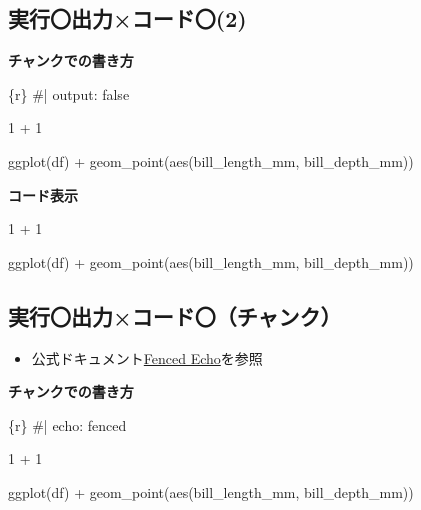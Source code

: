\documentclass[
  b5paper,
  xelatex, ja=standard]{bxjsbook}
\newenvironment{Shaded}{\begin{snugshade}}{\end{snugshade}}
\newcommand{\DecValTok}[1]{\textcolor[rgb]{0.68,0.00,0.00}{#1}}
\newcommand{\FunctionTok}[1]{\textcolor[rgb]{0.28,0.35,0.67}{#1}}
\newcommand{\InformationTok}[1]{\textcolor[rgb]{0.37,0.37,0.37}{#1}}
\newcommand{\NormalTok}[1]{\textcolor[rgb]{0.00,0.23,0.31}{#1}}
\newcommand{\SpecialCharTok}[1]{\textcolor[rgb]{0.37,0.37,0.37}{#1}}
\providecommand{\tightlist}{%
  \setlength{\itemsep}{0pt}\setlength{\parskip}{0pt}}\usepackage{longtable,booktabs,array}
\begin{document}
\subsection{実行〇\textbar 出力×\textbar コード〇(2)}

\textbf{チャンクでの書き方}

\begin{Shaded}
\begin{Highlighting}[]
\InformationTok{\textasciigrave{}\textasciigrave{}\textasciigrave{}\{r\}}
\InformationTok{\#| output: false}

\InformationTok{1 + 1}


\InformationTok{ggplot(df) +}
\InformationTok{  geom\_point(aes(bill\_length\_mm, bill\_depth\_mm))}
\InformationTok{\textasciigrave{}\textasciigrave{}\textasciigrave{}}
\end{Highlighting}
\end{Shaded}

\textbf{コード表示}

\begin{Shaded}
\begin{Highlighting}[]
\DecValTok{1} \SpecialCharTok{+} \DecValTok{1}


\FunctionTok{ggplot}\NormalTok{(df) }\SpecialCharTok{+}
  \FunctionTok{geom\_point}\NormalTok{(}\FunctionTok{aes}\NormalTok{(bill\_length\_mm, bill\_depth\_mm))}
\end{Highlighting}
\end{Shaded}

\subsection{実行〇\textbar 出力×\textbar コード〇（チャンク）}

\begin{itemize}
\tightlist
\item
  公式ドキュメント\href{https://quarto.org/docs/computations/execution-options.html\#fenced-echo}{Fenced
  Echo}を参照
\end{itemize}

\textbf{チャンクでの書き方}

\begin{Shaded}
\begin{Highlighting}[]
\InformationTok{\textasciigrave{}\textasciigrave{}\textasciigrave{}\{r\}}
\InformationTok{\#| echo: fenced}

\InformationTok{1 + 1}


\InformationTok{ggplot(df) +}
\InformationTok{  geom\_point(aes(bill\_length\_mm, bill\_depth\_mm))}
\InformationTok{\textasciigrave{}\textasciigrave{}\textasciigrave{}}
\end{Highlighting}
\end{Shaded}
\end{document}
